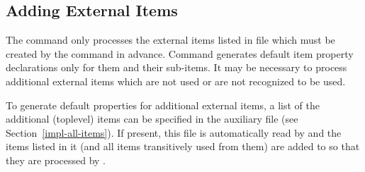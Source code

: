 \subsection{Adding External Items}
\label{app-itemprops-extern}

The command  only processes the external items listed in file  which must be created
by the command  in advance. Command  generates default item property declarations only
for them and their sub-items. It may be necessary to process additional external items which are not used or are not recognized
to be used. 

To generate default properties for additional external items, a list of the additional (toplevel) items can be 
specified in the auxiliary file  (see Section~\ref{impl-all-items}). If present, this file is 
automatically read by  and the items listed in it (and all items transitively used from them) are added to 
 so that they are processed by .
